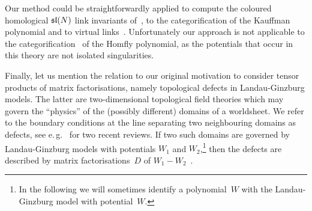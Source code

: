 \documentclass{compositio}
\theoremstyle{definition}
\numberwithin{equation}{section}
\begin{document}
Our method could be straightforwardly applied to compute the coloured homological $\mathfrak{sl}(N)$ link invariants of~\cite{w0907.0695}, to the categorification of the Kauffman polynomial and to virtual links~\cite{kr0701333}. Unfortunately our approach is not applicable to the categorification~\cite{kr0505056} of the Homfly polynomial, as the potentials that occur in this theory are not isolated singularities. 

\medskip

Finally, let us mention the relation to our original motivation to consider tensor products of matrix factorisations, namely topological defects in Landau-Ginzburg models. The latter are two-dimensional topological field theories which may govern the ``physics'' of the (possibly different) domains of a worldsheet.  We refer to the boundary conditions at the line separating two neighbouring domains as defects, see e.\,g.~\cite{k1004.2307, dkr1107.0495} for two recent reviews. If two such domains are governed by Landau-Ginzburg models with potentials $W_{1}$ and $W_{2}$,\footnote{In the following we will sometimes identify a polynomial~$W$ with the Landau-Ginzburg model with potential~$W$.} then the defects are described by matrix factorisations~$D$ of $W_{1}-W_{2}$~\cite{br0707.0922}. 
\end{document}

